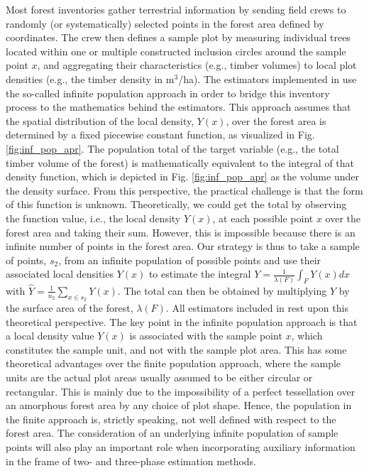 Most forest inventories gather terrestrial information by sending field crews to randomly (or systematically) selected points in the forest area defined by coordinates. The crew then defines a sample plot by measuring individual trees located within one or multiple constructed inclusion circles around the sample point $x$, and aggregating their characteristics (e.g., timber volumes) to local plot densities (e.g., the timber density in m$^3$/ha). The estimators implemented in  use the so-called infinite population approach in order to bridge this inventory process to the mathematics behind the estimators. This approach assumes that the spatial distribution of the local density, $Y(x)$, over the forest area is determined by a fixed piecewise constant function, as visualized in Fig. \ref{fig:inf_pop_apr}. The population total of the target variable (e.g., the total timber volume of the forest) is mathematically equivalent to the integral of that density function, which is depicted in Fig. \ref{fig:inf_pop_apr} as the volume under the density surface. From this perspective, the practical challenge is that the form of this function is unknown. Theoretically, we could get the total by observing the function value, i.e., the local density $Y(x)$, at each possible point $x$ over the forest area and taking their sum. However, this is impossible because there is an infinite number of points in the forest area. Our strategy is thus to take a sample of points, $s_2$, from an infinite population of possible points and use their associated local densities $Y(x)$ to estimate the integral $Y=\frac{1}{\lambda(F)}\int_{F}Y(x)dx$ with $\hat{Y}=\frac{1}{n_2}\sum_{x \in s_2}Y(x)$. The total can then be obtained by multiplying $\hat{Y}$ by the surface area of the forest, $\lambda(F)$. All estimators included in  rest upon this theoretical perspective. The key point in the infinite population approach is that a local density value $Y(x)$ is associated with the sample point $x$, which constitutes the sample unit, and not with the sample plot area. This has some theoretical advantages over the finite population approach, where the sample units are the actual plot areas usually assumed to be either circular or rectangular.  This is mainly due to the impossibility of a perfect tessellation over an amorphous forest area by any choice of plot shape. Hence, the population in the finite approach is, strictly speaking, not well defined with respect to the forest area. The consideration of an underlying infinite population of sample points will also play an important role when incorporating auxiliary information in the frame of two- and three-phase estimation methods.


